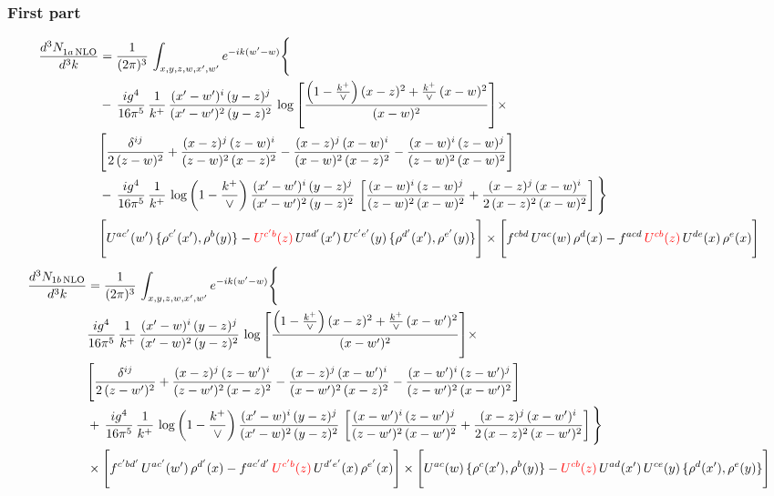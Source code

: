 \documentclass[9pt]{article}
\numberwithin{equation}{section}
\begin{document}
\subsubsection{First part}
\begin{align}
 \frac{d^{3}N_{1a\,\rm NLO}^{\rm}}{d^{3}k}  & =     \frac{1}{(2\pi)^{3}}\,\int_{x,y,z,w,x',w^{\prime}} e^{-ik(w^{\prime}-w)}\Bigg\{\notag \\
& -\, \frac{ig^{4}}{16\pi^{5}}\,\frac{1}{k^{+}}\, \frac{(x'-w')^{i}\,(y-z)^{j}}{(x'-w')^{2}\,(y-z)^{2}}\,\log{\left[\frac{\left(1-\frac{k^{+}}{\vee}\right)(x-z)^{2}+\frac{k^{+}}{\vee}\,(x-w)^{2}}{(x-w)^{2}}\right]}\times\notag \\ &  \Bigg[\frac{\delta^{ij}}{2\,(z-w)^{2}}+\frac{(x-z)^{j}\,(z-w)^{i}}{(z-w)^{2}\,(x-z)^{2}}-\frac{(x-z)^{j}\,(x-w)^{i}}{(x-w)^{2}\,(x-z)^{2}}-\frac{(x-w)^{i}\,(z-w)^{j}}{(z-w)^{2}\,(x-w)^{2}}\Bigg] \notag \\
& -\, \frac{ig^{4}}{16\pi^{5}}\,\frac{1}{k^{+}}\,\log{\left(1-\frac{k^{+}}{\vee}\right)}\,\frac{(x'-w')^{i}\,(y-z)^{j}}{(x'-w')^{2}\,(y-z)^{2}}\,\left[\frac{(x-w)^{i}\,(z-w)^{j}}{(z-w)^{2}\,(x-w)^{2}}+\frac{(x-z)^{j}\,(x-w)^{i}}{2\,(x-z)^{2}\, (x-w)^{2}}\right]\Bigg\} \notag \\ & \Bigg[U^{ac'}(w')\,\{\rho^{c'}(x'),\rho^{b}(y)\}-{\color{red}U^{c'b}(z)}\,U^{ad'}(x')\,U^{c'e'}(y)\, \{\rho^{d'}(x'),\rho^{e'}(y)\}\Bigg]\times \Bigg[f^{cbd}\,U^{ac}(w)\,\rho^{d}(x)-f^{acd}\, {\color{red}U^{cb}(z)}\,U^{de}(x)\,\rho^{e}(x)\Bigg]
\end{align}
\begin{align}
\frac{d^{3}N_{1b\, \rm NLO}}{d^{3}k} & =  \frac{1}{(2\pi)^{3}}\,\int_{x,y,z,w,x',w^{\prime}} e^{-ik(w^{\prime}-w)}\Bigg\{\notag \\
&  \frac{ig^{4}}{16\pi^{5}}\,\frac{1}{k^{+}}\, \frac{(x'-w)^{i}\,(y-z)^{j}}{(x'-w)^{2}\,(y-z)^{2}}\,\log{\left[\frac{\left(1-\frac{k^{+}}{\vee}\right)(x-z)^{2}+\frac{k^{+}}{\vee}\,(x-w')^{2}}{(x-w')^{2}}\right]}\times\notag \\ &  \Bigg[\frac{\delta^{ij}}{2\,(z-w')^{2}}+\frac{(x-z)^{j}\,(z-w')^{i}}{(z-w')^{2}\,(x-z)^{2}}-\frac{(x-z)^{j}\,(x-w')^{i}}{(x-w')^{2}\,(x-z)^{2}}-\frac{(x-w')^{i}\,(z-w')^{j}}{(z-w')^{2}\,(x-w')^{2}}\Bigg] \notag \\
& +\,\frac{ig^{4}}{16\pi^{5}}\,\frac{1}{k^{+}}\,\log{\left(1-\frac{k^{+}}{\vee}\right)}\,\frac{(x'-w)^{i}\,(y-z)^{j}}{(x'-w)^{2}\,(y-z)^{2}}\,\left[\frac{(x-w')^{i}\,(z-w')^{j}}{(z-w')^{2}\,(x-w')^{2}}+\frac{(x-z)^{j}\,(x-w')^{i}}{2\,(x-z)^{2}\, (x-w')^{2}}\right]\Bigg\} \notag \\ & \times\Bigg[f^{c'bd'}\,U^{ac'}(w')\,\rho^{d'}(x)-f^{ac'd'}\, {\color{red}U^{c'b}(z)}\,U^{d'e'}(x)\,\rho^{e'}(x)\Bigg] \times \Bigg[U^{ac}(w)\,\{\rho^{c}(x'),\rho^{b}(y)\}-{\color{red}U^{cb}(z)}\,U^{ad}(x')\,U^{ce}(y)\, \{\rho^{d}(x'),\rho^{e}(y)\}\Bigg]
\end{align}
\end{document}
